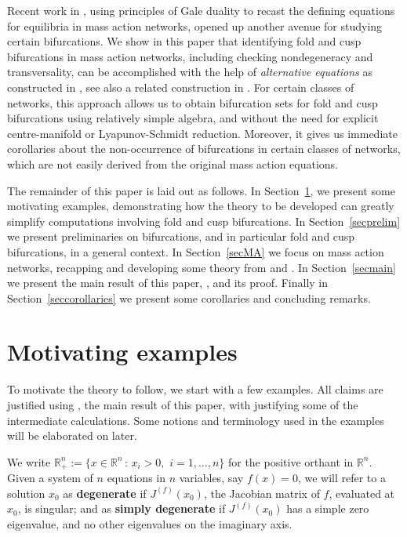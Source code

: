 \documentclass[11pt]{amsart}
\theoremstyle{definition}
\begin{document}
Recent work in \cite{banajifeliu26}, using principles of Gale duality \cite{sottile:book} to recast the defining equations for equilibria in mass action networks, opened up another avenue for studying certain bifurcations. We show in this paper that identifying fold and cusp bifurcations in mass action networks, including checking nondegeneracy and transversality, can be accomplished with the help of {\em alternative equations} as constructed in \cite{banajifeliu26}, see also a related construction in \cite{regensburger:gale}. For certain classes of networks, this approach allows us to obtain bifurcation sets for fold and cusp bifurcations using relatively simple algebra, and without the need for explicit centre-manifold or Lyapunov-Schmidt reduction. Moreover, it gives us immediate corollaries about the non-occurrence of bifurcations in certain classes of networks, which are not easily derived from the original mass action equations. 

The remainder of this paper is laid out as follows. In Section~\ref{secexamples}, we present some motivating examples, demonstrating how the theory to be developed can greatly simplify computations involving fold and cusp bifurcations. In Section~\ref{secprelim} we present preliminaries on bifurcations, and in particular fold and cusp bifurcations, in a general context. In Section~\ref{secMA} we focus on mass action networks, recapping and developing some theory from \cite{BBH2024smallbif} and \cite{banajifeliu26}. In Section~\ref{secmain} we present the main result of this paper, , and its proof. Finally in Section~\ref{seccorollaries} we present some corollaries and concluding remarks. 

\section{Motivating examples}
\label{secexamples}
To motivate the theory to follow, we start with a few examples. All claims are justified using , the main result of this paper, with  justifying some of the intermediate calculations. Some notions and terminology used in the examples will be elaborated on later. 

We write $\mathbb{R}^n_+:=\{x \in \mathbb{R}^n\,:\,x_i> 0,\,\,i=1,\ldots,n\}$ for the positive orthant in $\mathbb{R}^n$. Given a system of $n$ equations in $n$ variables, say $f(x) = 0$, we will refer to a solution $x_0$ as {\bf degenerate} if $J^{(f)}(x_0)$, the Jacobian matrix of $f$, evaluated at $x_0$, is singular; and as {\bf simply degenerate} if $J^{(f)}(x_0)$ has a simple zero eigenvalue, and no other eigenvalues on the imaginary axis. 
\end{document}
